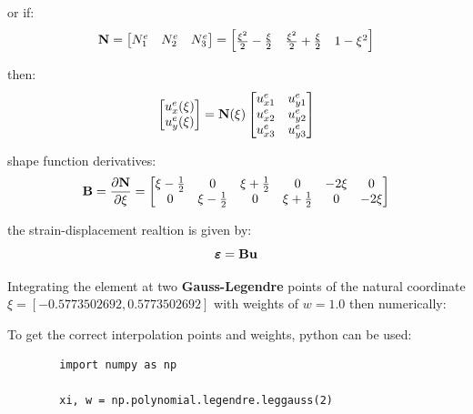 or if:
\begin{equation}
    \mathbf{N} = \begin{bmatrix}
        N_1^e & N_2^e & N_3^e \\
    \end{bmatrix}
    = \begin{bmatrix}
        \frac{\xi^2}{2} - \frac{\xi}{2} &
        \frac{\xi^2}{2} + \frac{\xi}{2} &
        1 - \xi^2
    \end{bmatrix}
\end{equation}

then:
\begin{equation}
    \begin{bmatrix}
        u_x^e(\xi) \\
        u_y^e(\xi) \\
    \end{bmatrix}
    = \mathbf{N}(\xi) \begin{bmatrix}
        u_{x1}^e & u_{y1}^e \\
        u_{x2}^e & u_{y2}^e \\
        u_{x3}^e & u_{y3}^e \\
    \end{bmatrix}
\end{equation}

shape function derivatives:
\begin{equation}
    \mathbf{B} = \frac{\partial \mathbf{N}}{\partial \xi} =
    \begin{bmatrix}
        \xi -\frac{1}{2} & 0 & \xi + \frac{1}{2} & 0 & -2 \xi & 0 \\
        0 & \xi -\frac{1}{2} & 0 & \xi + \frac{1}{2} & 0 & -2 \xi \\
    \end{bmatrix}
\end{equation}

the strain-displacement realtion is given by:
\begin{equation}
    \pmb{\varepsilon} = \mathbf{B} \mathbf{u}
\end{equation}

Integrating the element at two \textbf{Gauss-Legendre} points of the natural
coordinate $ \xi = [-0.5773502692, 0.5773502692] $ with weights of $ w = 1.0 $
then numerically:

\begin{bbox}

    To get the correct interpolation points and weights, python can be used:

    \begin{verbatim}
        import numpy as np

        xi, w = np.polynomial.legendre.leggauss(2)
    \end{verbatim}

\end{bbox}

